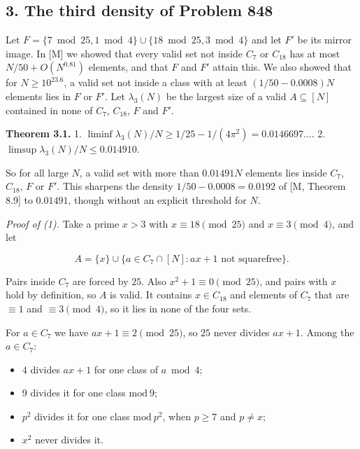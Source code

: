 \documentclass[
  11pt,
]{article}
\providecommand{\tightlist}{%
  \setlength{\itemsep}{0pt}\setlength{\parskip}{0pt}}
\begin{document}
\subsection{3. The third density of Problem 848}

Let \(F = \{7 \bmod 25, 1 \bmod 4\} \cup \{18 \bmod 25, 3 \bmod 4\}\)
and let \(F'\) be its mirror image. In {[}M{]} we showed that every
valid set not inside \(C_7\) or \(C_{18}\) has at most
\(N/50 + O(N^{0.81})\) elements, and that \(F\) and \(F'\) attain this.
We also showed that for \(N \ge 10^{23.6}\), a valid set not inside a
class with at least \((1/50 - 0.0008)N\) elements lies in \(F\) or
\(F'\). Let \(\lambda_3(N)\) be the largest size of a valid
\(A \subseteq [N]\) contained in none of \(C_7\), \(C_{18}\), \(F\) and
\(F'\).

\textbf{Theorem 3.1.} 1.
\(\liminf \lambda_3(N)/N \ge 1/25 - 1/(4\pi^2) = 0.0146697\dots\). 2.
\(\limsup \lambda_3(N)/N \le 0.014910\).

So for all large \(N\), a valid set with more than \(0.01491N\) elements
lies inside \(C_7\), \(C_{18}\), \(F\) or \(F'\). This sharpens the
density \(1/50 - 0.0008 = 0.0192\) of {[}M, Theorem 8.9{]} to
\(0.01491\), though without an explicit threshold for \(N\).

\emph{Proof of (1).} Take a prime \(x > 3\) with
\(x \equiv 18 \pmod{25}\) and \(x \equiv 3 \pmod{4}\), and let

\[A = \{x\} \cup \{a \in C_7 \cap [N] : ax + 1 \text{ not squarefree}\}.\]

Pairs inside \(C_7\) are forced by \(25\). Also
\(x^2 + 1 \equiv 0 \pmod{25}\), and pairs with \(x\) hold by definition,
so \(A\) is valid. It contains \(x \in C_{18}\) and elements of \(C_7\)
that are \(\equiv 1\) and \(\equiv 3 \pmod{4}\), so it lies in none of
the four sets.

For \(a \in C_7\) we have \(ax + 1 \equiv 2 \pmod{25}\), so \(25\) never
divides \(ax + 1\). Among the \(a \in C_7\):

\begin{itemize}
\tightlist
\item
  \(4\) divides \(ax + 1\) for one class of \(a \bmod 4\);
\item
  \(9\) divides it for one class \(\mathrm{mod}\ 9\);
\item
  \(p^2\) divides it for one class \(\mathrm{mod}\ p^2\), when
  \(p \ge 7\) and \(p \ne x\);
\item
  \(x^2\) never divides it.
\end{itemize}
\end{document}
